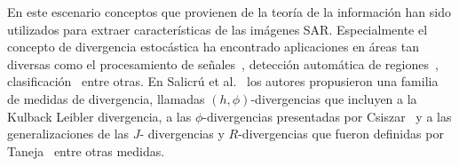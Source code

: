 \documentclass[11pt]{article}
\begin{document}
En este escenario conceptos que provienen de la teoría de la información han sido utilizados para extraer características de las imágenes SAR. Especialmente el concepto de divergencia estocástica ha encontrado aplicaciones en áreas tan diversas como el procesamiento de señales~\cite {Aviyente2007}, detección automática de regiones~\cite{Nascimento2009,SilvaCribariFrery:ImprovedLikelihood:Environmetrics}, clasificación~\cite{Puig2003} entre otras. 
En Salicrú et al.~\cite{Salicru1994} los autores propusieron una familia de medidas de divergencia, llamadas $(h,\phi)$-divergencias que incluyen a la Kulback Leibler divergencia, a las $\phi$-divergencias presentadas por Csiszar~\cite{Csiszar1967} y a las generalizaciones de las $J$- divergencias y $R$-divergencias que fueron definidas por Taneja~\cite{Taneja1989} entre otras medidas. 


%
%
\end{document}
